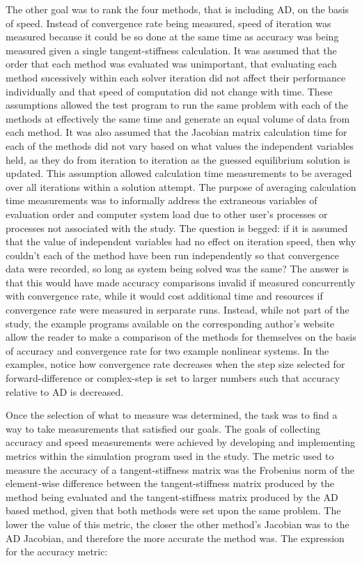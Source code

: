 \documentclass[preprint,12pt]{elsarticle}
\begin{document}
The other goal was to rank the four methods, that is including AD, on the basis of speed. Instead of
convergence rate being measured, speed of iteration was measured because it could be so done at the
same time as accuracy was being measured given a single tangent-stiffness calculation.  It was
assumed that the order that each method was evaluated was unimportant, that evaluating each method
sucessively within each solver iteration did not affect their performance individually and that
speed of computation did not change with time. These assumptions allowed the test program to run the
same problem with each of the methods at effectively the same time and generate an equal volume of
data from each method. It was also assumed that the Jacobian matrix calculation time for each of the
methods did not vary based on what values the independent variables held, as they do from iteration
to iteration as the guessed equilibrium solution is updated.  This assumption allowed calculation
time measurements to be averaged over all iterations within a solution attempt. The purpose of
averaging calculation time measurements was to informally address the extraneous variables of
evaluation order and computer system load due to other user's processes or processes not associated
with the study. The question is begged: if it is assumed that the value of independent variables
had no effect on iteration speed, then why couldn't each of the method have been run independently
so that convergence data were recorded, so long as system being solved was the same? The answer is
that this would have made accuracy comparisons invalid if measured concurrently with convergence
rate, while it would cost additional time and resources if convergence rate were measured in
serparate runs. Instead, while not part of the study, the example programs available on the
corresponding author's website allow the reader to make a comparison of the methods for themselves
on the basis of accuracy and convergence rate for two example nonlinear systems. In the examples,
notice how convergence rate decreases when the step size selected for forward-difference or
complex-step is set to larger numbers such that accuracy relative to AD is decreased.

Once the selection of what to measure was determined, the task was to find a way to take measurements
that satisfied our goals. The goals of collecting accuracy and speed measurements were achieved by
developing and implementing metrics within the simulation program used in the study. The metric used
to measure the accuracy of a tangent-stiffness matrix was the Frobenius norm of the element-wise
difference between the tangent-stiffness matrix produced by the method being evaluated and the
tangent-stiffness matrix produced by the AD based method, given that both methods were set upon the
same problem. The lower the value of this metric, the closer the other method's Jacobian was to the
AD Jacobian, and therefore the more accurate the method was. The expression for the accuracy metric:
\end{document}
